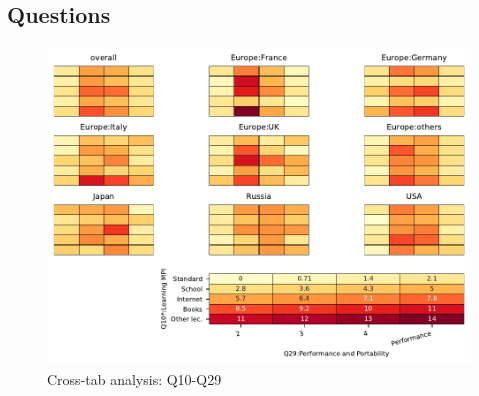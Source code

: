 
\subsection{Questions}


\begin{figure}
\begin{center}
\includegraphics[width=12cm]{../pdfs/Q10-Q29.pdf}
\caption{Cross-tab analysis: Q10-Q29}
\label{fig:Q10-Q29}
\end{center}
\end{figure}

